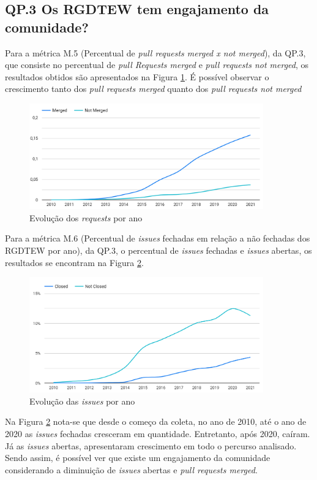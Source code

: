 \documentclass[12pt]{article}
\begin{document}
\subsection{QP.3 Os RGDTEW tem engajamento da comunidade?}

Para a métrica M.5 (Percentual de \emph{pull requests merged x not merged}), da QP.3, que consiste no percentual de \emph{pull Requests merged} e \emph{pull requests not merged}, os resultados obtidos são apresentados na Figura \ref{fig:Evolução dos Pull Requests por ano}. É possível observar o crescimento tanto dos \emph{pull requests merged} quanto dos  \emph{pull requests not merged}
\begin{figure}[ht]
    \centering
    \includegraphics[width=0.9\textwidth]{images/percentual por ano PR.png}
    \caption{Evolução dos \emph{requests} por ano}
    \label{fig:Evolução dos Pull Requests por ano}
\end{figure}

Para a métrica M.6 (Percentual de \textit{issues} fechadas em relação a não fechadas dos RGDTEW por ano), da QP.3, o percentual de \emph{issues} fechadas e  \emph{issues} abertas, os resultados se encontram na Figura \ref{fig:Evolução das Issues por ano}.
\begin{figure}[ht]
    \centering
    \includegraphics[width=0.9\textwidth]{images/issues por ano.png}
    \caption{Evolução das \emph{issues} por ano}
    \label{fig:Evolução das Issues por ano}
\end{figure}
Na Figura \ref{fig:Evolução das Issues por ano} nota-se que desde o começo da coleta, no ano de 2010, até o ano de 2020 as \emph{issues} fechadas cresceram em quantidade. Entretanto, após 2020, caíram. Já as \emph{issues} abertas, apresentaram crescimento em todo o percurso analisado. Sendo assim, é possível ver que existe um engajamento da comunidade considerando a diminuição de \emph{issues} abertas e \emph{pull requests merged}.
\end{document}
